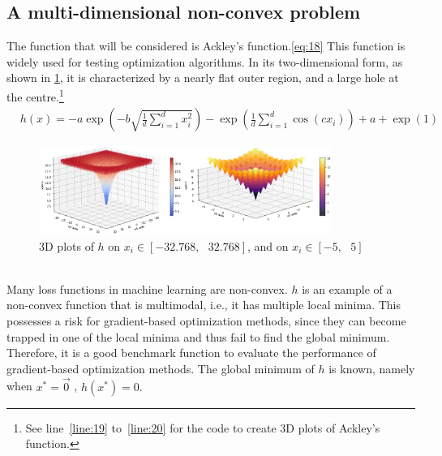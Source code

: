 \subsection{A multi-dimensional non-convex problem}
The function that will be considered is Ackley's function.\ref{eq:18} This function is widely used for testing optimization algorithms.\cite{Test_functions} In its two-dimensional form, as shown in \ref{fig:Ackelys_plot}, it is characterized by a nearly flat outer region, and a large hole at the centre.\footnote{See line~\ref{line:19} to~\ref{line:20} for the code to create 3D plots of Ackley's function.}
\begin{equation*}\label{eq:18}\tag{5.3.1}
\begin{aligned}
&h(x) = -a\exp\left(-b\sqrt{\frac{1}{d}\sum_{i=1}^{d} x_{i}^{2}}\right) - \exp\left(\frac{1}{d}\sum_{i=1}^{d} \cos(cx_{i})\right) + a + \exp(1) 
\end{aligned}
\end{equation*}
\begin{figure}[h!]
    \centering
        \includegraphics[width=0.85\textwidth]{Pictures/Merged_Ackleys_plot.png}
    \caption{3D plots of $h$ on $x_{i} \in [-32.768,\text{ } 32.768]$, and on $x_{i} \in [-5,\text{ } 5]$}\label{fig:Ackelys_plot}
\end{figure}\\
 Many loss functions in machine learning are non-convex. $h$ is an example of a non-convex function that is multimodal, i.e., it has multiple local minima. This possesses a risk for gradient-based optimization methods, since they can become trapped in one of the local minima and thus fail to find the global minimum. Therefore, it is a good benchmark function to evaluate the performance of gradient-based optimization methods. The global minimum of $h$ is known, namely when $x^{*} = \vec{0}$ , $h(x^{*}) = 0.$ 
